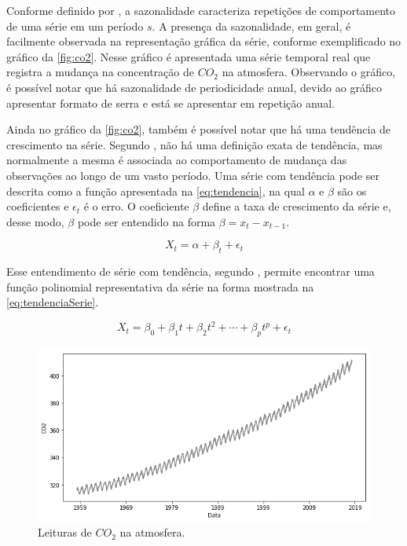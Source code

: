 \documentclass[
    12pt,
    oneside,
    a4paper,
    english,
    brazil
]{abntex2}
\begin{document}
Conforme   definido  por   ,   a  sazonalidade   caracteriza
repetições  de comportamento  de uma  série em  um período  $s$. A  presença da
sazonalidade,  em geral,  é facilmente  observada na  representação gráfica  da
série, conforme exemplificado no gráfico  da \autoref{fig:co2}. Nesse gráfico é
apresentada uma série  temporal real que registra a mudança  na concentração de
$CO_2$ na atmosfera. Observando o gráfico, é possível notar que há sazonalidade
de periodicidade anual, devido ao gráfico apresentar formato de serra e está se
apresentar em repetição anual.

Ainda  no  gráfico  da  \autoref{fig:co2},  também  é  possível  notar  que  há
uma  tendência de  crescimento na  série. Segundo  , não  há
uma  definição exata  de  tendência, mas  normalmente a  mesma  é associada  ao
comportamento  de  mudança  das  observações  ao longo  de  um  vasto  período.
Uma  série  com tendência  pode  ser  descrita  como  a função  apresentada  na
\autoref{eq:tendencia},  na  qual $\alpha$  e  $\beta$  são os  coeficientes  e
$\epsilon_t$ é  o erro. O coeficiente  $\beta$ define a taxa  de crescimento da
série  e, desse  modo, $\beta$  pode  ser entendido  na  forma $\beta  = x_t  -
x_{t-1}$.

\begin{equation}
    \label{eq:tendencia} X_t = \alpha + \beta_t + \epsilon_t
\end{equation}

Esse entendimento de série  com tendência, segundo , permite
encontrar uma  função polinomial representativa  da série na forma  mostrada na
\autoref{eq:tendenciaSerie}.

\begin{equation}
    \label{eq:tendenciaSerie}
    X_t = \beta_0 + \beta_1t + \beta_2t^2 + \cdots + \beta_{p}t^p + \epsilon_t
\end{equation}


\begin{figure}[ht]
    \centering
    \caption{Leituras de $CO_2$ na atmosfera.}\label{fig:co2}
    \includegraphics[width=.5\linewidth]{images/co2.png}
\end{figure}
\end{document}
